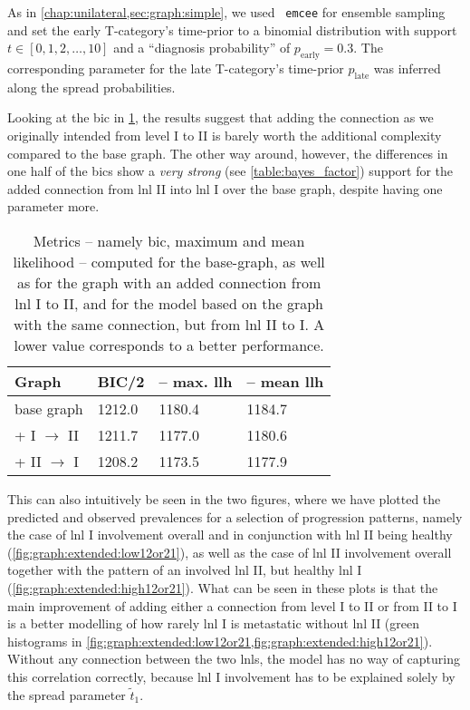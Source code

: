 \documentclass[\relativeRoot/main.tex]{subfiles}
\begin{document}
As in \cref{chap:unilateral,sec:graph:simple}, we used ~\texttt{emcee} for ensemble sampling and set the early T-category's time-prior to a binomial distribution with support $t \in [0, 1, 2, \ldots, 10]$ and a ``diagnosis probability'' of $p_\text{early} = 0.3$. The corresponding parameter for the late T-category's time-prior $p_\text{late}$ was inferred along the spread probabilities.

Looking at the \gls{bic} in \cref{table:graph:extend:12or21}, the results suggest that adding the connection as we originally intended from level I to II is barely worth the additional complexity compared to the base graph. The other way around, however, the differences in one half of the \glspl{bic} show a \emph{very strong} (see \cref{table:bayes_factor}) support for the added connection from \gls{lnl} II into \gls{lnl} I over the base graph, despite having one parameter more.

\begin{table}
    \centering
        \begin{tabular}{|l|l|l|l|}
            \hline
            \textbf{Graph} & \textbf{BIC/2} & \textbf{-- max. llh} & \textbf{-- mean llh} \\
            \hline
            base graph & 1212.0 & 1180.4 & 1184.7 \\
            + I $\rightarrow$ II & 1211.7 & 1177.0 & 1180.6 \\
            + II $\rightarrow$ I & 1208.2 & 1173.5 & 1177.9 \\
            \hline
        \end{tabular}
        \caption[
            Metrics: Direction of arc between LNL I and II
        ]{
            Metrics -- namely \gls{bic}, maximum and mean likelihood -- computed for the base-graph, as well as for the graph with an added connection from \gls{lnl} I to II, and for the model based on the graph with the same connection, but from \gls{lnl} II to I. A lower value corresponds to a better performance.
        }
        \label{table:graph:extend:12or21}
\end{table}

This can also intuitively be seen in the two figures, where we have plotted the predicted and observed prevalences for a selection of progression patterns, namely the case of \gls{lnl} I involvement overall and in conjunction with \gls{lnl} II being healthy (\cref{fig:graph:extended:low12or21}), as well as the case of \gls{lnl} II involvement overall together with the pattern of an involved \gls{lnl} II, but healthy \gls{lnl} I (\cref{fig:graph:extended:high12or21}). What can be seen in these plots is that the main improvement of adding either a connection from level I to II or from II to I is a better modelling of how rarely \gls{lnl} I is metastatic without \gls{lnl} II (green histograms in \cref{fig:graph:extended:low12or21,fig:graph:extended:high12or21}). Without any connection between the two \glspl{lnl}, the model has no way of capturing this correlation correctly, because \gls{lnl} I involvement has to be explained solely by the spread parameter $\tilde{t}_1$.
\end{document}
